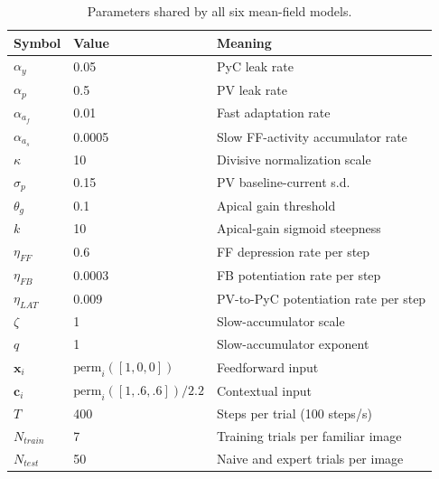 \begin{table}[h!]
\centering
\small
\begin{tabular}{lll}
\hline
Symbol & Value & Meaning \\
\hline
$\alpha_y$ & 0.05 & PyC leak rate \\
$\alpha_p$ & 0.5 & PV leak rate \\
$\alpha_{a_f}$ & 0.01 & Fast adaptation rate \\
$\alpha_{a_s}$ & 0.0005 & Slow FF-activity accumulator rate \\
$\kappa$ & 10 & Divisive normalization scale \\
$\sigma_p$ & 0.15 & PV baseline-current s.d. \\
$\theta_g$ & 0.1 & Apical gain threshold \\
$k$ & 10 & Apical-gain sigmoid steepness \\
$\eta_{FF}$ & 0.6 & FF depression rate per step \\
$\eta_{FB}$ & 0.0003 & FB potentiation rate per step \\
$\eta_{LAT}$ & 0.009 & PV-to-PyC potentiation rate per step \\
$\zeta$ & 1 & Slow-accumulator scale \\
$q$ & 1 & Slow-accumulator exponent \\
$\mathbf{x}_i$ & $\text{perm}_i([1,0,0])$ & Feedforward input \\
$\mathbf{c}_i$ & $\text{perm}_i([1,.6,.6])/2.2$ & Contextual input \\
$T$ & 400 & Steps per trial (100 steps/s) \\
$N_{train}$ & 7 & Training trials per familiar image \\
$N_{test}$ & 50 & Naive and expert trials per image \\
\hline
\end{tabular}
\caption{Parameters shared by all six mean-field models.}
\label{tab:mean-field-shared}
\end{table}

